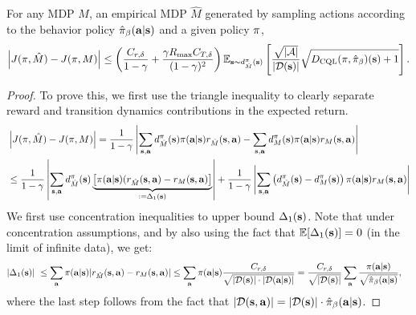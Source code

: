 \begin{lemma}
For any MDP $M$, an empirical MDP $\hat{M}$ generated by sampling actions according to the behavior policy $\hat{\pi}_\beta(\mathbf{a}|\mathbf{s})$ and a given policy $\pi$,
\begin{equation*}
    \left\vert J(\pi, \hat{M}) - J(\pi, M) \right\vert \leq \left({\frac{C_{r, \delta}}{1 - \gamma} + \frac{\gamma R_{\max} C_{T, \delta}}{(1 - \gamma)^2}} \right)\mathbb{E}_{\mathbf{s} \sim d^{\pi}_{\hat{M}}(\mathbf{s})}\left[ \frac{\sqrt{|\mathcal{A}|}}{{|\mathcal{D}(\mathbf{s})|}} \sqrt{ D_{\text{CQL}}(\pi, \hat{\pi}_\beta)(\mathbf{s}) + 1} \right].
\end{equation*}
\end{lemma}
\begin{proof}
To prove this, we first use the triangle inequality to clearly separate reward and transition dynamics contributions in the expected return.
\begin{align}
    & \left\vert J(\pi, \hat{M}) - J(\pi, M) \right\vert = \frac{1}{1 - \gamma} \left\vert \sum_{\mathbf{s}, \mathbf{a}} d^\pi_{\hat{M}}(\mathbf{s}) \pi(\mathbf{a}|\mathbf{s}) r_{\hat{M}}(\mathbf{s}, \mathbf{a}) -  \sum_{\mathbf{s}, \mathbf{a}} d^\pi_{{M}}(\mathbf{s}) \pi(\mathbf{a}|\mathbf{s}) r_{{M}}(\mathbf{s}, \mathbf{a}) \right\vert\\
    &\leq \frac{1}{1 - \gamma} \left\vert \sum_{\mathbf{s}, \mathbf{a}} d^\pi_{\hat{M}}(\mathbf{s}) \underbrace{\left[ \pi(\mathbf{a}|\mathbf{s}) ( r_{\hat{M}}(\mathbf{s}, \mathbf{a}) - r_M(\mathbf{s}, \mathbf{a}) \right]}_{:= \Delta_1(\mathbf{s})} \right\vert + \frac{1}{1 - \gamma} \left\vert \sum_{\mathbf{s}, \mathbf{a}} \left(d^\pi_{\hat{M}}(\mathbf{s}) - d^\pi_{{M}}(\mathbf{s}) \right) \pi(\mathbf{a}|\mathbf{s}) r_M(\mathbf{s}, \mathbf{a}) \right\vert
\end{align}
We first use concentration inequalities to upper bound $\Delta_1(\mathbf{s})$. Note that under concentration assumptions, and by also using the fact that $\mathbb{E}[\Delta_1(\mathbf{s})] = 0$ (in the limit of infinite data), we get:
\begin{align*}
    \vert\Delta_1(\mathbf{s})\vert &~ \leq \sum_{\mathbf{a}} \pi(\mathbf{a}|\mathbf{s}) \vert r_{\hat{M}}(\mathbf{s}, \mathbf{a}) - r_{M}(\mathbf{s}, \mathbf{a})\vert \leq \sum_{\mathbf{a}} \pi(\mathbf{a}|\mathbf{s}) \frac{C_{r, \delta}}{\sqrt{|\mathcal{D}(\mathbf{s})| \cdot |\mathcal{D}(\mathbf{a}|\mathbf{s})|}} = \frac{C_{r, \delta}}{\sqrt{|\mathcal{D}(\mathbf{s})|}} \sum_{\mathbf{a}} \frac{\pi(\mathbf{a}|\mathbf{s})}{\sqrt{\hat{\pi}_\beta(\mathbf{a}|\mathbf{s})}},
\end{align*}
where the last step follows from the fact that $|\mathcal{D}(\mathbf{s}, \mathbf{a})| = |\mathcal{D}(\mathbf{s})| \cdot \hat{\pi}_\beta(\mathbf{a}|\mathbf{s})$.


\end{proof}
